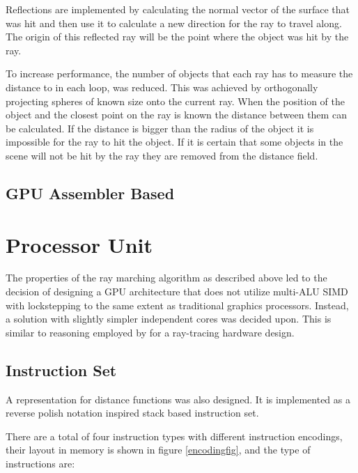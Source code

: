			Reflections are implemented by calculating the normal vector of the
			surface that was hit and then use it to calculate a new direction
			for the ray to travel along. The origin of this reflected ray will
			be the point where the object was hit by the ray.
			
			To increase performance, the number of objects that each ray has to
			measure the distance to in each loop, was reduced. This was
			achieved by orthogonally projecting spheres of known size onto the
			current ray.  When the position of the object and the closest point
			on the ray is known the distance between them can be calculated. If
			the distance is bigger than the radius of the object it is
			impossible for the ray to hit the object. If it is certain that
			some objects in the scene will not be hit by the ray they are
			removed from the distance field.
	
		\subsection{GPU Assembler Based}

	\section{Processor Unit} \label{implproc}

		The properties of the ray marching algorithm as described above led to
		the decision of designing a GPU architecture that does not utilize
		multi-ALU SIMD with lockstepping to the same extent as traditional
		graphics processors. Instead, a solution with slightly simpler
		independent cores was decided upon. This is similar to reasoning
		employed by \cite{Woop2005} for a ray-tracing hardware design.
	
		\subsection{Instruction Set}

			A representation for distance functions was also designed. It is
			implemented as a reverse polish notation inspired stack based 
			instruction set.
	
			There are a total of four instruction types with different
			instruction encodings, their layout in memory is shown in figure
			\ref{encodingfig}, and the type of instructions are:

